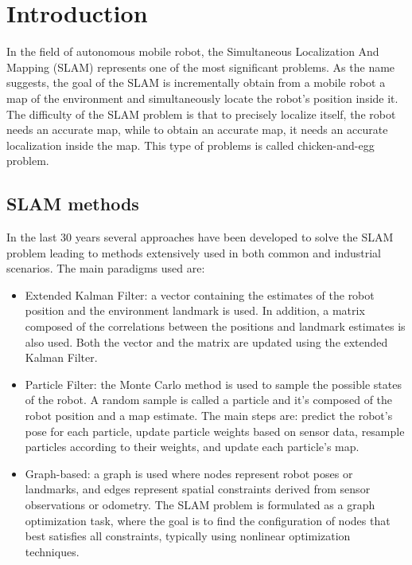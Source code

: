 \section{Introduction}
In the field of autonomous mobile robot, the Simultaneous Localization And Mapping (SLAM) represents
one of the most significant problems. As the name suggests, the goal of the SLAM is incrementally obtain 
from a mobile robot a map of the environment and simultaneously locate the robot's position inside it.
The difficulty of the SLAM problem is that to precisely localize itself, the robot needs an accurate map,
while to obtain an accurate map, it needs an accurate localization inside the map. This type of problems is 
called chicken-and-egg problem.

\subsection{SLAM methods}
In the last 30 years several approaches have been developed to solve the SLAM problem leading to methods 
extensively used in both common and industrial scenarios. The main paradigms \cite{Stachniss2016} used are:
\begin{itemize}
    \item Extended Kalman Filter: a vector containing the estimates of the robot position and the environment 
    landmark is used. In addition, a matrix composed of the correlations between the positions and landmark
    estimates is also used. Both the vector and the matrix are updated using the extended Kalman Filter.
    \item Particle Filter: the Monte Carlo method is used to sample the possible states of the robot. A
    random sample is called a particle and it's composed of the robot position and a map estimate. The main 
    steps are: predict the robot’s pose for each particle, update particle weights based on sensor data,
    resample particles according to their weights, and update each particle’s map.
    \item Graph-based: a graph is used where nodes represent robot poses or landmarks, and edges represent
    spatial constraints derived from sensor observations or odometry. The SLAM problem is formulated as a 
    graph optimization task, where the goal is to find the configuration of nodes that best satisfies all 
    constraints, typically using nonlinear optimization techniques.
\end{itemize}

